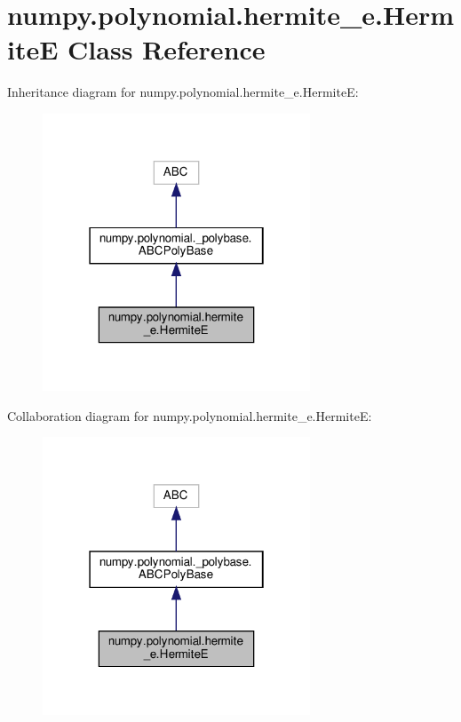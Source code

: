 \hypertarget{classnumpy_1_1polynomial_1_1hermite__e_1_1HermiteE}{}\section{numpy.\+polynomial.\+hermite\+\_\+e.\+HermiteE Class Reference}
\label{classnumpy_1_1polynomial_1_1hermite__e_1_1HermiteE}


Inheritance diagram for numpy.\+polynomial.\+hermite\+\_\+e.\+HermiteE\+:
\nopagebreak
\begin{figure}[H]
\begin{center}
\leavevmode
\includegraphics[width=226pt]{classnumpy_1_1polynomial_1_1hermite__e_1_1HermiteE__inherit__graph}
\end{center}
\end{figure}


Collaboration diagram for numpy.\+polynomial.\+hermite\+\_\+e.\+HermiteE\+:
\nopagebreak
\begin{figure}[H]
\begin{center}
\leavevmode
\includegraphics[width=226pt]{classnumpy_1_1polynomial_1_1hermite__e_1_1HermiteE__coll__graph}
\end{center}
\end{figure}
